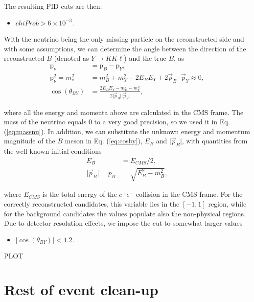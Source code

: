 \documentclass[oneside,a4paper,openany,12pt]{scrbook}
\begin{document}
The resulting PID cuts are then:
\begin{itemize}
\item $chiProb > 6\times 10^{-3}$.
\end{itemize}

With the neutrino being the only missing particle on the reconstructed side and with some assumptions, we can determine the angle between the direction of the reconstructed $B$ (denoted as $Y \to K K \ell$) and the true $B$, as
\begin{align}
\mathrm{p}_\nu &= \mathrm{p}_B - \mathrm{p}_{Y}, \\
\label{eq:massnu}
\mathrm{p}_\nu^2 = m_\nu^2 &= m_B^2 + m_Y^2 - 2E_BE_Y + 2\vec{p}_B \cdot \vec{p}_Y \approx 0, \\ 
\label{eq:cosby}
\cos \left(\theta_{BY}\right) &= \frac{2E_BE_Y - m_B^2 - m_Y^2}{2\vert \vec{p}_B \vert \vert \vec{p}_Y\vert},
\end{align} 

where all the energy and momenta above are calculated in the CMS frame. The mass of the neutrino equals 0 to a very good precision, so we used it in Eq. (\ref{eq:massnu}). In addition, we can substitute the unknown energy and momentum magnitude of the $B$ meson in Eq. (\ref{eq:cosby}), $E_B$ and $\vert \vec{p}_B \vert$, with quantities from the well known initial conditions
\begin{align}
E_B &= E_{CMS} / 2,\\
\vert \vec{p}_B \vert = p_B &= \sqrt{E_B^2 - m_B^2},
\end{align} 

where $E_{CMS}$ is the total energy of the $e^+e^-$ collision in the CMS frame. For the correctly reconstructed candidates, this variable  lies in the $[-1,1]$ region, while for the background candidates the values populate also the non-physical regions. Due to detector resolution effects, we impose the cut to somewhat larger values
\begin{itemize}
\item $\vert \cos \left(\theta_{BY}\right) \vert < 1.2$.
\end{itemize}

\begin{center}
PLOT
\end{center}

\section{Rest of event clean-up}
\end{document}
